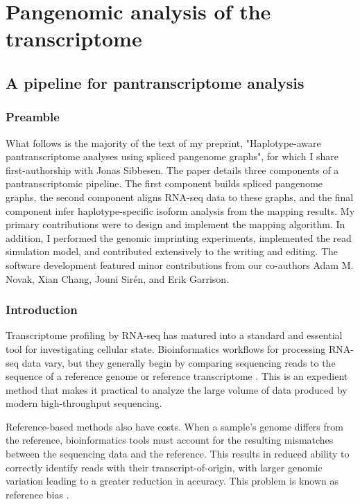 \documentclass[11pt]{ucthesis}
\begin{document}
\part{Pangenomic analysis of the transcriptome}

\chapter{A pipeline for pantranscriptome analysis}
\label{chapter:mpmap}

\section{Preamble}

What follows is the majority of the text of my preprint, "Haplotype-aware pantranscriptome analyses using spliced pangenome graphs", for which I share first-authorship with Jonas Sibbesen\cite{sibbesen2021haplotype}. The paper details three components of a pantranscriptomic pipeline. The first component builds spliced pangenome graphs, the second component aligns RNA-seq data to these graphs, and the final component infer haplotype-specific isoform analysis from the mapping results. My primary contributions were to design and implement the mapping algorithm. In addition, I performed the genomic imprinting experiments, implemented the read simulation model, and contributed extensively to the writing and editing. The software development featured minor contributions from our co-authors Adam M. Novak, Xian Chang, Jouni Sir\'{e}n, and Erik Garrison.

\section{Introduction}

Transcriptome profiling by RNA-seq has matured into a standard and essential tool for investigating cellular state. Bioinformatics workflows for processing RNA-seq data vary, but they generally begin by comparing sequencing reads to the sequence of a reference genome or reference transcriptome \cite{li2011rsem,dobin2013star,bray2016near,patro2017salmon}. This is an expedient method that makes it practical to analyze the large volume of data produced by modern high-throughput sequencing.

Reference-based methods also have costs. When a sample's genome differs from the reference, bioinformatics tools must account for the resulting mismatches between the sequencing data and the reference. This results in reduced ability to correctly identify reads with their transcript-of-origin, with larger genomic variation leading to a greater reduction in accuracy. This problem is known as reference bias \cite{stevenson2013sources}.
\end{document}
